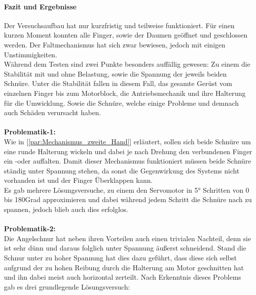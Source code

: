 \documentclass[titlepage,12pt,twoside]{article}
\begin{document}
\paragraph{Fazit und Ergebnisse}
\hfill \break
\hfill \break
Der Versuchsaufbau hat nur kurzfristig und teilweise funktioniert. Für einen kurzen Moment konnten alle Finger, sowie der Daumen geöffnet und geschlossen werden. Der Faltmechanismus hat sich zwar bewiesen, jedoch mit einigen Unstimmigkeiten. \\
Während dem Testen sind zwei Punkte besonders auffällig gewesen: Zu einem die Stabilität mit und ohne Belastung, sowie die Spannung der jeweils beiden Schnüre. Unter die Stabilität fallen in diesem Fall, das gesamte Gerüst vom einzelnen Finger 
bis zum Motorblock, die Antriebsmechanik und ihre Halterung für die Umwicklung. Sowie die Schnüre, welche einige Probleme und demnach auch Schäden verursacht haben. \\
\\
\textbf{Problematik-1: } \\
Wie in [\textcolor{blue}{\autoref{par:Mechanismus_zweite_Hand}}] erläutert, sollen sich beide Schnüre um eine runde Halterung wickeln und dabei je nach Drehung den verbundenen Finger ein -oder auffalten. Damit dieser Mechanismus funktioniert müssen beide Schnüre 
ständig unter Spannung stehen, da sonst die Gegenwirkung des Systems nicht vorhanden ist und der Finger Überklappen kann. \\
Es gab mehrere Lösungsversuche, zu einem den Servomotor in 5° Schritten von 0 bis 180\textdegree Grad approximieren und dabei während jedem Schritt die Schnüre nach zu spannen, jedoch blieb auch dies erfolglos. \\
\\
\textbf{Problematik-2: } \\
Die Angelschnur hat neben ihren Vorteilen auch einen trivialen Nachteil, denn sie ist sehr dünn und daraus folglich unter Spannung äußerst schneidend. Stand die Schnur unter zu hoher Spannung hat dies dazu geführt, dass diese sich 
selbst aufgrund der zu hohen Reibung durch die Halterung am Motor geschnitten hat und ihn dabei meist auch horizontal zerteilt. Nach Erkenntnis dieses Problems gab es drei grundlegende Lösungsversuch:
\end{document}
